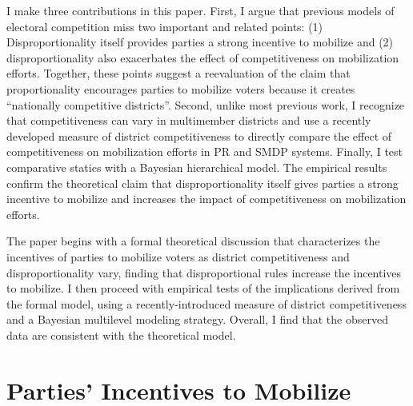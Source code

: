 \documentclass[12pt]{article}
\begin{document}
I make three contributions in this paper. First, I argue that previous models of electoral competition miss two important and related points: (1) Disproportionality itself provides parties a strong incentive to mobilize and (2) disproportionality also exacerbates the effect of competitiveness on mobilization efforts. Together, these points suggest a reevaluation of the claim that proportionality encourages parties to mobilize voters because it creates ``nationally competitive districts''. Second, unlike most previous work, I recognize that competitiveness can vary in multimember districts and use a recently developed measure of district competitiveness to directly compare the effect of competitiveness on mobilization efforts in PR and SMDP systems. Finally, I test comparative statics with a Bayesian hierarchical model. The empirical results confirm the theoretical claim that disproportionality itself gives parties a strong incentive to mobilize and increases the impact of competitiveness on mobilization efforts.

The paper begins with a formal theoretical discussion that characterizes the incentives of parties to mobilize voters as district competitiveness and disproportionality vary, finding that disproportional rules increase the incentives to mobilize. I then proceed with empirical tests of the implications derived from the formal model, using a recently-introduced measure of district competitiveness and a Bayesian multilevel modeling strategy. Overall, I find that the observed data are consistent with the theoretical model. 

\section*{Parties' Incentives to Mobilize}

\end{document}
